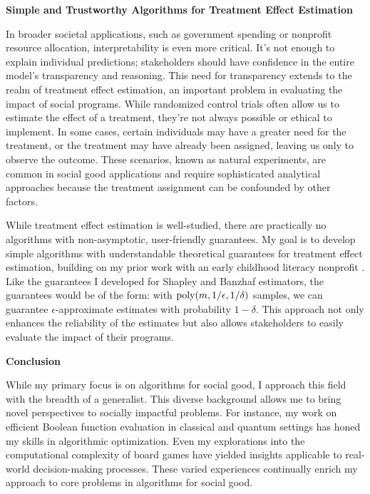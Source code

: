\documentclass[11pt]{article}
\begin{document}
{{ \large \textbf{Simple and Trustworthy Algorithms for Treatment Effect Estimation}}    

In broader societal applications, such as government spending or nonprofit resource allocation, interpretability is even more critical. It's not enough to explain individual predictions; stakeholders should have confidence in the entire model's transparency and reasoning. This need for transparency extends to the realm of treatment effect estimation, an important problem in evaluating the impact of social programs. While randomized control trials often allow us to estimate the effect of a treatment, they're not always possible or ethical to implement. In some cases, certain individuals may have a greater need for the treatment, or the treatment may have already been assigned, leaving us only to observe the outcome. These scenarios, known as natural experiments, are common in social good applications and require sophisticated analytical approaches because the treatment assignment can be confounded by other factors.

While treatment effect estimation is well-studied, there are practically no algorithms with non-asymptotic, user-friendly guarantees.
My goal is to develop simple algorithms with understandable theoretical guarantees for treatment effect estimation, building on my prior work with an early childhood literacy nonprofit \cite{witter2024benchmarking}.
Like the guarantees I developed for Shapley and Banzhaf estimators, the guarantees would be of the form: with $\textnormal{poly}(m, 1/\epsilon, 1/\delta)$ samples, we can guarantee $\epsilon$-approximate estimates with probability $1-\delta$.
This approach not only enhances the reliability of the estimates but also allows stakeholders to easily evaluate the impact of their programs.

{ \large \textbf{Conclusion}}

While my primary focus is on algorithms for social good, I approach this field with the breadth of a generalist. This diverse background allows me to bring novel perspectives to socially impactful problems. For instance, my work on efficient Boolean function evaluation in classical \cite{hellerstein2022adaptivity} and quantum settings \cite{czekanski2023robust,kimmel2021query,delorenzo2019applications} has honed my skills in algorithmic optimization. Even my explorations into the computational complexity of board games \cite{witter2020applications,witter2021backgammon} have yielded insights applicable to real-world decision-making processes. These varied experiences continually enrich my approach to core problems in algorithms for social good.

}
\end{document}
